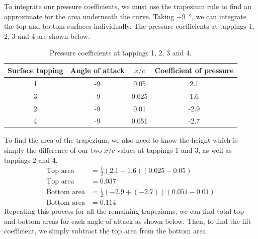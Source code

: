 \documentclass[11pt]{article}
\begin{document}
To integrate our pressure coefficients, we must use the trapezium rule to find an approximate for the area underneath the curve. Taking \SI{-9}{\degree}, we can integrate the top and bottom surfaces individually. The pressure coefficients at tappings 1, 2, 3 and 4 are shown below.
\begin{table}[H]
  \centering
  \label{q2bvals}
    \begin{tabular}{||c|c|c|c||} 
    \hline
    \textbf{Surface tapping} & \textbf{Angle of attack} & $x/c$ & \textbf{Coefficient of pressure}\\
    \hline
    \hline
    1 & -9 & 0.05 & 2.1\\
    3 & -9 & 0.025 & 1.6\\
    2 & -9 & 0.01 & -2.9\\
    4 & -9 & 0.051 & -2.7\\
    \hline
   \end{tabular}
   \caption{Pressure coefficients at tappings 1, 2, 3 and 4.}
\end{table}
To find the area of the trapezium, we also need to know the height which is simply the difference of our two $x/c$ values at tappings 1 and 3, as well as tappings 2 and 4.
\begin{align}
  \textrm{Top area} &= \frac{1}{2}\left(2.1 + 1.6\right)(0.025 -0.05)\\
  \textrm{Top area} &= 0.037\\
  \textrm{Bottom area} &= \frac{1}{2}\left(-2.9 + \left(-2.7\right)\right)(0.051-0.01)\\
  \textrm{Bottom area} &= 0.114
\end{align}
Repeating this process for all the remaining trapeziums, we can find total top and bottom areas for each angle of attack as shown below. Then, to find the lift coefficient, we simply subtract the top area from the bottom area.
\end{document}
